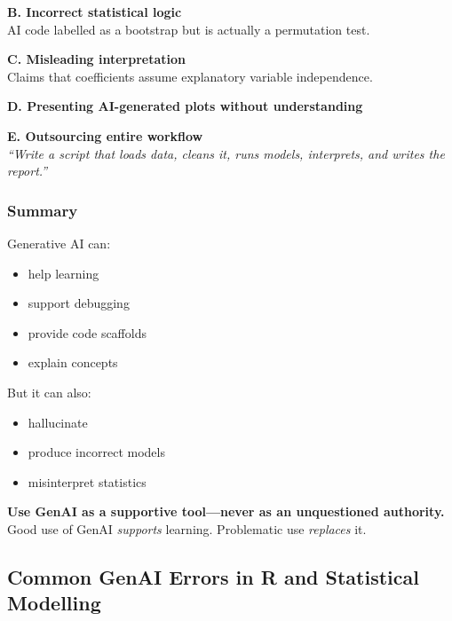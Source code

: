 \documentclass[
  letterpaper,
  8pt,
  a4paper]{book}
\providecommand{\tightlist}{%
  \setlength{\itemsep}{0pt}\setlength{\parskip}{0pt}}
\begin{document}
\textbf{B. Incorrect statistical logic}\\
AI code labelled as a bootstrap but is actually a permutation test.

\textbf{C. Misleading interpretation}\\
Claims that coefficients assume explanatory variable independence.

\textbf{D. Presenting AI-generated plots without understanding}

\textbf{E. Outsourcing entire workflow}\\
\emph{``Write a script that loads data, cleans it, runs models,
interprets, and writes the report.''}

\subsubsection*{Summary}\label{summary}

Generative AI can:

\begin{itemize}
\tightlist
\item
  help learning\\
\item
  support debugging\\
\item
  provide code scaffolds\\
\item
  explain concepts
\end{itemize}

But it can also:

\begin{itemize}
\tightlist
\item
  hallucinate\\
\item
  produce incorrect models\\
\item
  misinterpret statistics
\end{itemize}

\textbf{Use GenAI as a supportive tool---never as an unquestioned
authority.}\\
Good use of GenAI \emph{supports} learning. Problematic use
\emph{replaces} it.

\subsection*{Common GenAI Errors in R and Statistical
Modelling}\label{common-genai-errors-in-r-and-statistical-modelling}
\end{document}
